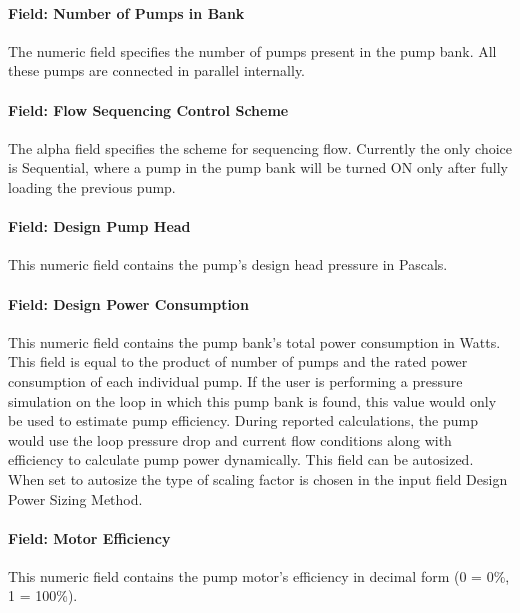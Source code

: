 \paragraph{Field: Number of Pumps in Bank}\label{field-number-of-pumps-in-bank}

The numeric field specifies the number of pumps present in the pump bank. All these pumps are connected in parallel internally.

\paragraph{Field: Flow Sequencing Control Scheme}\label{field-flow-sequencing-control-scheme}

The alpha field specifies the scheme for sequencing flow. Currently the only choice is Sequential, where a pump in the pump bank will be turned ON only after fully loading the previous pump.

\paragraph{Field: Design Pump Head}\label{field-design-pump-head-3}

This numeric field contains the pump's design head pressure in Pascals.

\paragraph{Field: Design Power Consumption}\label{field-design-power-consumption-3}

This numeric field contains the pump bank's total power consumption in Watts. This field is equal to the product of number of pumps and the rated power consumption of each individual pump. If the user is performing a pressure simulation on the loop in which this pump bank is found, this value would only be used to estimate pump efficiency. During reported calculations, the pump would use the loop pressure drop and current flow conditions along with efficiency to calculate pump power dynamically. This field can be autosized. When set to autosize the type of scaling factor is chosen in the input field Design Power Sizing Method.

\paragraph{Field: Motor Efficiency}\label{field-motor-efficiency-3-000}

This numeric field contains the pump motor's efficiency in decimal form (0 = 0\%, 1 = 100\%).

